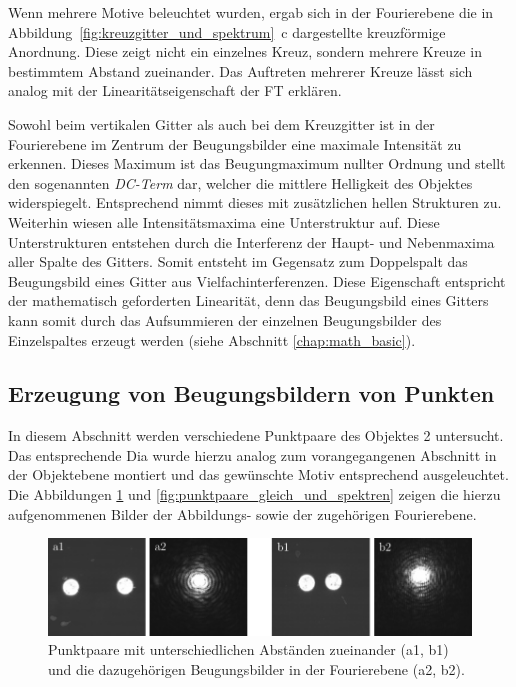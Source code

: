Wenn mehrere Motive beleuchtet wurden, ergab sich in der Fourierebene die in Abbildung~\ref{fig:kreuzgitter_und_spektrum}~c dargestellte kreuzförmige Anordnung. Diese zeigt nicht ein einzelnes Kreuz, sondern mehrere Kreuze in bestimmtem Abstand zueinander. Das Auftreten mehrerer Kreuze lässt sich analog mit der Linearitätseigenschaft der FT erklären.

Sowohl beim vertikalen Gitter als auch bei dem Kreuzgitter ist in der Fourierebene im Zentrum der Beugungsbilder eine maximale Intensität zu erkennen. Dieses Maximum ist das Beugungmaximum nullter Ordnung und stellt den sogenannten \textit{DC-Term} dar, welcher die mittlere Helligkeit des Objektes widerspiegelt. Entsprechend nimmt dieses mit zusätzlichen hellen Strukturen zu.
Weiterhin wiesen alle Intensitätsmaxima eine Unterstruktur auf. Diese Unterstrukturen entstehen durch die Interferenz der Haupt- und Nebenmaxima aller Spalte des Gitters. Somit entsteht im Gegensatz zum Doppelspalt das Beugungsbild eines Gitter aus Vielfachinterferenzen. Diese Eigenschaft entspricht der mathematisch geforderten Linearität, denn das Beugungsbild eines Gitters kann somit durch das Aufsummieren der einzelnen Beugungsbilder des Einzelspaltes erzeugt werden (siehe Abschnitt \ref{chap:math_basic}).


\subsection{Erzeugung von Beugungsbildern von Punkten}

In diesem Abschnitt werden verschiedene Punktpaare des Objektes 2 untersucht. Das entsprechende Dia wurde hierzu analog zum vorangegangenen Abschnitt in der Objektebene montiert und das gewünschte Motiv entsprechend ausgeleuchtet. Die Abbildungen \ref{fig:punktpaare_verschieden_und_spektren} und \ref{fig:punktpaare_gleich_und_spektren} zeigen die hierzu aufgenommenen Bilder der Abbildungs- sowie der zugehörigen Fourierebene. 

\begin{figure}[h]
	\centering
	\includegraphics{images/Regina/abb15.pdf}
	\caption[Punktpaare unterschiedlicher Abstände und Fourierspektren]{
		Punktpaare mit unterschiedlichen Abständen zueinander (a1, b1) und die dazugehörigen Beugungsbilder in der Fourierebene (a2, b2).
	}
	\label{fig:punktpaare_verschieden_und_spektren}
\end{figure}

